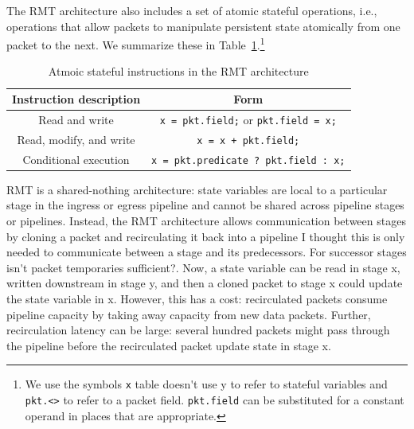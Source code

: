 The RMT architecture also includes a set of atomic stateful operations, i.e., 
operations that allow packets to manipulate persistent state atomically from
one packet to the next.  We summarize these in
Table~\ref{t:stateful_inst}.\footnote{We use the symbols {\tt x} %
\ac{table doesn't use y} to refer to
stateful variables and {\tt pkt.<>} to refer to a packet field.
{\tt pkt.field} can be substituted for a constant operand in places that are appropriate.}
\begin{table}
\begin{small}
\begin{tabular}{|c|c|}
\hline
Instruction description & Form \\
\hline
Read and write & \texttt{x = pkt.field;} or \texttt{pkt.field = x;} \\
\hline
Read, modify, and write & \texttt{x = x + pkt.field;} \\
\hline
Conditional execution & \texttt{x = pkt.predicate ? pkt.field : x;} \\
\hline
\end{tabular}
\end{small}
\caption{Atmoic stateful instructions in the RMT architecture}
\label{t:stateful_inst}
\end{table}

RMT is a shared-nothing architecture: state variables are local to a particular
stage in the ingress or egress pipeline and cannot be shared across pipeline
stages or pipelines. 
Instead, the RMT architecture allows communication between stages by cloning a
packet and recirculating it back into a pipeline \ac{I thought this is only needed
to communicate between a stage and its predecessors. For successor stages isn't
packet temporaries sufficient?}.
Now, a state variable can
be read in stage x, written downstream in stage y, and then a cloned packet to
stage x could update the state variable in x. However, this has a cost:
recirculated packets consume pipeline capacity by taking away capacity from
new data packets. Further, recirculation latency can be large: several hundred
packets might pass through the pipeline before the recirculated packet update
state in stage x.

